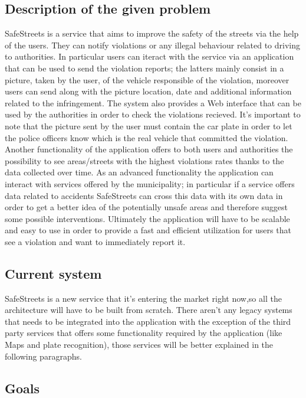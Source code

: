 \subsection{Description of the given problem}
SafeStreets is a service that aims to improve the safety of the streets via the help of the users. They can notify violations or any illegal behaviour related to driving to authorities. In particular users can iteract with the service via an application that can be used to send the violation reports; the latters mainly consist in a picture, taken by the user, of the vehicle responsible of the violation, moreover users can send along with the picture location, date and additional information related to the infringement. The system also provides a Web interface that can be used by the authorities in order to check the violations recieved. It's important to note that the picture sent by the user must contain the car plate in order to let the police officers know which is the real vehicle that committed the violation. Another functionality of the application offers to both users and authorities the possibility to see areas/streets with the highest violations rates thanks to the data collected over time. As an advanced functionality the application can interact with services offered by the municipality; in particular if a service offers data related to accidents SafeStreets can cross this data with its own data in order to get a better idea of the potentially unsafe areas and therefore suggest some possible interventions. Ultimately the application will have to be scalable and easy to use in order to provide a fast and efficient utilization for users that see a violation and want to immediately report it.

\subsection{Current system}
SafeStreets is a new service that it's entering the market right now,so all the architecture will have to be built from scratch. There aren't any legacy systems that needs to be integrated into the application with the exception of the third party services that offers some functionality required by the application (like Maps and plate recognition), those services will be better explained in the following paragraphs.


\subsection{Goals}

